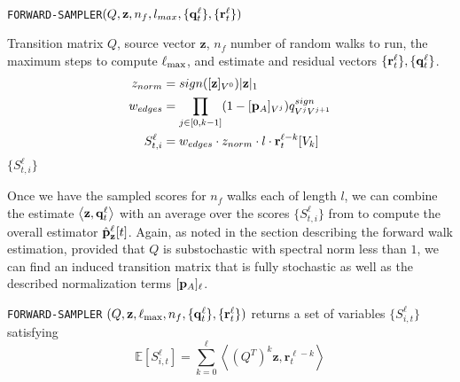 \begin{algorithm}[ht]
\caption{\texttt{FORWARD-SAMPLER}$(Q, \mathbf{z}, n_f, l_{max}, \{\mathbf{q}^{\ell}_t\},\{\mathbf{r}^{\ell}_t\})$}
\label{alg:fwalk}
\begin{algorithmic}[1]
\REQUIRE Transition matrix $Q$, source vector $\mathbf{z}$, $n_f$ number of random walks to run, the maximum steps to compute $\ell_{\max}$, and estimate and residual vectors $\{\mathbf{r}^{\ell}_t\}, \{\mathbf{q}^{\ell}_t\}$.
\begin{align*}
z_{norm} &= sign([\mathbf{z}]_{V^0})|\mathbf{z}|_1 \\
w_{edges} &= \prod_{j \in [0, k-1]} (1- [\mathbf{p}_A]_{V^j})q^{sign}_{V^j V^{j+1}} \\
S_{t, i}^{\ell} &= w_{edges}\cdot z_{norm} \cdot l \cdot \mathbf{r}^{\ell-k}_t[V_k]
\end{align*}
\ENDFOR
\ENDFOR
\RETURN $\{S_{t, i}^{\ell}\}$
\end{algorithmic}
\end{algorithm} 

Once we have the sampled scores for $n_f$ walks each of length $l$, we can combine the estimate $\left< \mathbf{z}, \mathbf{q}^{\ell}_t \right>$ with an average over the scores $\{S_{t, i}^{\ell}\}$ from to compute the overall estimator $\hat{\mathbf{p}}_\mathbf{z}^{\ell}[t]$.
Again, as noted in the section describing the forward walk estimation, provided that $Q$ is substochastic with spectral norm less than $1$, we can find an induced transition matrix that is fully stochastic as well as the described normalization terms $[\mathbf{p}_A]_{\ell}$.

\begin{lemma}
\texttt{FORWARD-SAMPLER} $(Q, \mathbf{z}, \ell_{\max}, n_f, \{\mathbf{q}^{\ell}_t\}, \{\mathbf{r}^{\ell}_t\})$ returns a set of variables $\{S_{i, t}^{\ell}\}$ satisfying
$$\mathbb{E}\left[S_{i, t}^{\ell}\right] = \sum_{k=0}^{\ell} \left<(Q^T)^k\mathbf{z}, \mathbf{r}_t^{\ell-k} \right>$$
\end{lemma}

